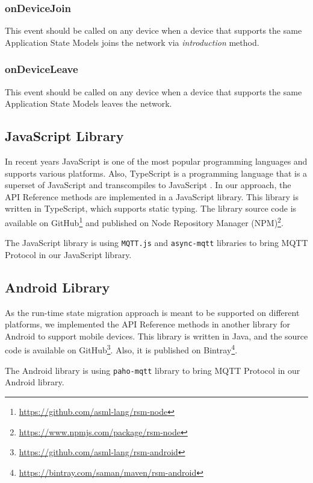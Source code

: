 \subsubsection{onDeviceJoin}
This event should be called on any device when a device that supports the same Application State Models joins the network via \textit{introduction} method.

\subsubsection{onDeviceLeave}
This event should be called on any device when a device that supports the same Application State Models leaves the network.


\subsection{JavaScript Library}
In recent years JavaScript is one of the most popular programming languages and supports various platforms. Also, TypeScript is a programming language that is a superset of JavaScript and transcompiles to JavaScript  \cite{typescript}. In our approach, the API Reference methods are implemented in a JavaScript library. This library is written in TypeScript, which supports static typing. The library source code is available on GitHub\footnote{\url{https://github.com/asml-lang/rsm-node}} and published on Node Repository Manager (NPM)\footnote{\url{https://www.npmjs.com/package/rsm-node}}.

The JavaScript library is using \lstinline[basicstyle=\ttfamily]{MQTT.js} and \lstinline[basicstyle=\ttfamily]{async-mqtt} libraries to bring MQTT Protocol in our JavaScript library.


\subsection{Android Library}
As the run-time state migration approach is meant to be supported on different platforms, we implemented the API Reference methods in another library for Android to support mobile devices. This library is written in Java, and
the source code is available on GitHub\footnote{\url{https://github.com/asml-lang/rsm-android}}. Also, it is published on Bintray\footnote{\url{https://bintray.com/saman/maven/rsm-android}}.

The Android library is using \lstinline[basicstyle=\ttfamily]{paho-mqtt} library to bring MQTT Protocol in our Android library.

